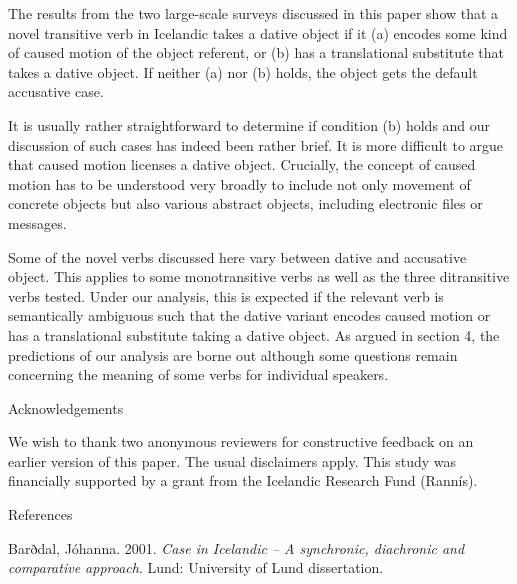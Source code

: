 \begin{styleStandard}
The results from the two large-scale surveys discussed in this paper show that a novel transitive verb in Icelandic takes a dative object if it (a) encodes some kind of caused motion of the object referent, or (b) has a translational substitute that takes a dative object. If neither (a) nor (b) holds, the object gets the default accusative case. 
\end{styleStandard}

\begin{styleStandard}
It is usually rather straightforward to determine if condition (b) holds and our discussion of such cases has indeed been rather brief. It is more difficult to argue that caused motion licenses a dative object. Crucially, the concept of caused motion has to be understood very broadly to include not only movement of concrete objects but also various abstract objects, including electronic files or messages. 
\end{styleStandard}

\begin{styleStandard}
Some of the novel verbs discussed here vary between dative and accusative object. This applies to some monotransitive verbs as well as the three ditransitive verbs tested. Under our analysis, this is expected if the relevant verb is semantically ambiguous such that the dative variant encodes caused motion or has a translational substitute taking a dative object. As argued in section 4, the predictions of our analysis are borne out although some questions remain concerning the meaning of some verbs for individual speakers. 
\end{styleStandard}

\begin{stylelsSectioni}
Acknowledgements
\end{stylelsSectioni}

\begin{styleStandard}
We wish to thank two anonymous reviewers for constructive feedback on an earlier version of this paper. The usual disclaimers apply. This study was financially supported by a grant from the Icelandic Research Fund (Rannís).
\end{styleStandard}

\begin{stylelsSectioni}
References
\end{stylelsSectioni}

\begin{styleStandard}
Barðdal, Jóhanna. 2001. \textit{Case in Icelandic – A synchronic, diachronic and comparative approach}. Lund: University of Lund dissertation. 
\end{styleStandard}

